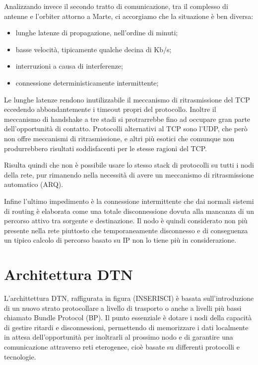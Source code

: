 \documentclass[12pt,a4paper,oneside]{book}
\begin{document}
		Analizzando invece il secondo tratto di comunicazione, tra il complesso di antenne e l'orbiter attorno a Marte, ci accorgiamo che la situazione è ben diversa:
		\begin{itemize}
			\item lunghe latenze di propagazione, nell'ordine di minuti;
			\item basse velocità, tipicamente qualche decina di Kb/s;
			\item interruzioni a causa di interferenze;
			\item connessione deterministicamente intermittente;
		\end{itemize}
		Le lunghe latenze rendono inutilizzabile il meccanismo di ritrasmissione del TCP eccedendo abbondantemente i timeout propri del protocollo. Inoltre il meccanismo di handshake a tre stadi si protrarrebbe fino ad occupare gran parte dell'opportunità di contatto. Protocolli alternativi al TCP sono l'UDP, che però non offre meccanismi di ritrasmissione, e altri più esotici che comunque non produrrebbero risultati soddisfacenti per le stesse ragioni del TCP.
		
		Risulta quindi che non è possibile usare lo stesso stack di protocolli su tutti i nodi della rete, pur rimanendo nella necessità di avere un meccanismo di ritrasmissione automatico (ARQ). 

		Infine l'ultimo impedimento è la connessione intermittente che dai normali sistemi di routing è elaborata come una totale disconnessione dovuta alla mancanza di un percorso attivo tra sorgente e destinazione. Il nodo è quindi considerato non più presente nella rete piuttosto che temporaneamente disconnesso e di conseguenza un tipico calcolo di percorso basato su IP non lo tiene più in considerazione.
		
		
		\section{Architettura DTN}		
		
		L'archittettura DTN, raffigurata in figura (INSERISCI) è basata sull'introduzione di un nuovo strato protocollare a livello di trasporto o anche a livelli più bassi chiamato Bundle Protocol (BP). Il punto essenziale è dotare i nodi della capacità di gestire ritardi e disconnessioni, permettendo di memorizzare i dati localmente in attesa dell'opportunità per inoltrarli al prossimo nodo e di garantire una comunicazione attraverso reti eterogenee, cioè basate su differenti protocolli e tecnologie. 
		
\end{document}
